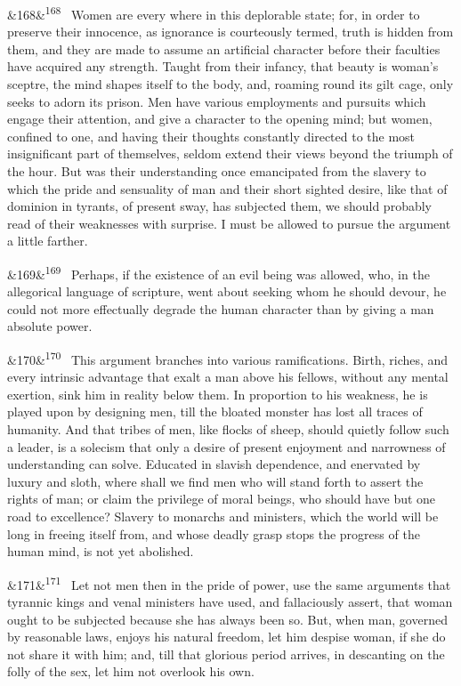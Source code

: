 \documentclass[12pt]{article}
\newcommand{\para}[1][]{\par\noindent\ifx&#1&\else\textsuperscript{\footnotesize #1}~\fi}
\begin{document}
\para[168] Women are every where in this deplorable state; for, in order to preserve their innocence, as ignorance is courteously termed, truth is hidden from them, and they are made to assume an artificial character before their faculties have acquired any strength. Taught from their infancy, that beauty is woman's sceptre, the mind shapes itself to the body, and, roaming round its gilt cage, only seeks to adorn its prison. Men have various employments and pursuits which engage their attention, and give a character to the opening mind; but women, confined to one, and having their thoughts constantly directed to the most insignificant part of themselves, seldom extend their views beyond the triumph of the hour. But was their understanding once emancipated from the slavery to which the pride and sensuality of man and their short sighted desire, like that of dominion in tyrants, of present sway, has subjected them, we should probably read of their weaknesses with surprise. I must be allowed to pursue the argument a little farther.

\para[169] Perhaps, if the existence of an evil being was allowed, who, in the allegorical language of scripture, went about seeking whom he should devour, he could not more effectually degrade the human character than by giving a man absolute power.

\para[170] This argument branches into various ramifications. Birth, riches, and every intrinsic advantage that exalt a man above his fellows, without any mental exertion, sink him in reality below them. In proportion to his weakness, he is played upon by designing men, till the bloated monster has lost all traces of humanity. And that tribes of men, like flocks of sheep, should quietly follow such a leader, is a solecism that only a desire of present enjoyment and narrowness of understanding can solve. Educated in slavish dependence, and enervated by luxury and sloth, where shall we find men who will stand forth to assert the rights of man; or claim the privilege of moral beings, who should have but one road to excellence? Slavery to monarchs and ministers, which the world will be long in freeing itself from, and whose deadly grasp stops the progress of the human mind, is not yet abolished.

\para[171] Let not men then in the pride of power, use the same arguments that tyrannic kings and venal ministers have used, and fallaciously assert, that woman ought to be subjected because she has always been so. But, when man, governed by reasonable laws, enjoys his natural freedom, let him despise woman, if she do not share it with him; and, till that glorious period arrives, in descanting on the folly of the sex, let him not overlook his own.
\end{document}

